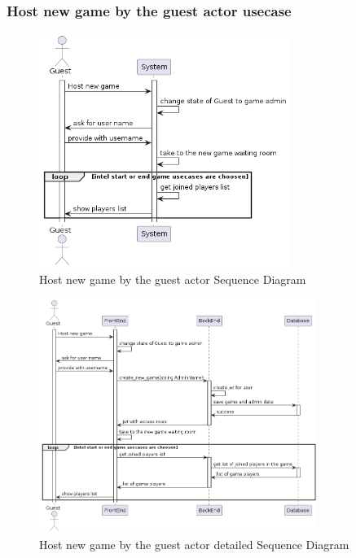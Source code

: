 \documentclass{article}
\begin{document}
\subsubsection{Host new game by the guest actor usecase}
 \begin{figure}[H]
	 \centering
	 \includegraphics[height=3in]{../thesis_tex/assets/diagrams/guest_host_game_SD.png}
	 \caption{Host new game by the guest actor Sequence Diagram}
\end{figure}

 \begin{figure}[H]
	 \centering
	 \includegraphics[height=3in]{../thesis_tex/assets/diagrams/guest_host_game_detailedSD.png}
	 \caption{Host new game by the guest actor detailed Sequence Diagram}
\end{figure}
\end{document}
